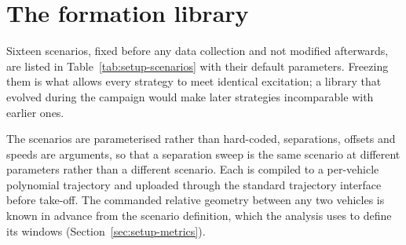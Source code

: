 \section{The formation library}
\label{sec:setup-scenarios}

Sixteen scenarios, fixed before any data collection and not modified afterwards, are listed in
Table~\ref{tab:setup-scenarios} with their default parameters. Freezing them is
what allows every strategy to meet identical excitation; a library that evolved during the campaign
would make later strategies incomparable with earlier ones.

The scenarios are parameterised rather than hard-coded, separations, offsets and speeds are
arguments, so that a separation sweep is the same scenario at different parameters rather than
a different scenario. Each is compiled to a per-vehicle polynomial trajectory and uploaded through
the standard trajectory interface before take-off. The commanded relative geometry between any two vehicles is known in advance from
the scenario definition, which the analysis uses to define its windows
(Section~\ref{sec:setup-metrics}).

